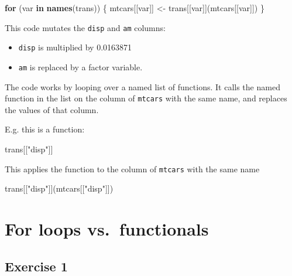 \documentclass[]{book}
\newenvironment{Shaded}{\begin{snugshade}}{\end{snugshade}}
\newcommand{\ControlFlowTok}[1]{\textcolor[rgb]{0.13,0.29,0.53}{\textbf{#1}}}
\newcommand{\KeywordTok}[1]{\textcolor[rgb]{0.13,0.29,0.53}{\textbf{#1}}}
\newcommand{\NormalTok}[1]{#1}
\newcommand{\StringTok}[1]{\textcolor[rgb]{0.31,0.60,0.02}{#1}}
\providecommand{\tightlist}{%
  \setlength{\itemsep}{0pt}\setlength{\parskip}{0pt}}
\theoremstyle{definition}
\theoremstyle{definition}
\theoremstyle{definition}
\theoremstyle{remark}
\begin{document}
\begin{Shaded}
\begin{Highlighting}[]
\ControlFlowTok{for}\NormalTok{ (var }\ControlFlowTok{in} \KeywordTok{names}\NormalTok{(trans)) \{}
\NormalTok{  mtcars[[var]] <-}\StringTok{ }\NormalTok{trans[[var]](mtcars[[var]])}
\NormalTok{\}}
\end{Highlighting}
\end{Shaded}

This code mutates the \texttt{disp} and \texttt{am} columns:

\begin{itemize}
\tightlist
\item
  \texttt{disp} is multiplied by 0.0163871
\item
  \texttt{am} is replaced by a factor variable.
\end{itemize}

The code works by looping over a named list of functions. It calls the
named function in the list on the column of \texttt{mtcars} with the
same name, and replaces the values of that column.

E.g. this is a function:

\begin{Shaded}
\begin{Highlighting}[]
\NormalTok{trans[[}\StringTok{"disp"}\NormalTok{]]}
\end{Highlighting}
\end{Shaded}

This applies the function to the column of \texttt{mtcars} with the same
name

\begin{Shaded}
\begin{Highlighting}[]
\NormalTok{trans[[}\StringTok{"disp"}\NormalTok{]](mtcars[[}\StringTok{"disp"}\NormalTok{]])}
\end{Highlighting}
\end{Shaded}

\hypertarget{for-loops-vs.functionals}{%
\section{For loops vs.~functionals}\label{for-loops-vs.functionals}}

\hypertarget{exercise-1-54}{%
\subsection{Exercise 1}\label{exercise-1-54}}
\end{document}

